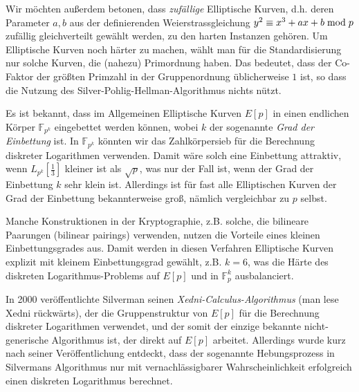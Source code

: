 \begin{refsegment}
Wir möchten außerdem betonen, dass {\em zufällige} Elliptische Kurven, d.h. deren Parameter $a,b$ aus der definierenden Weierstrassgleichung $y^2 \equiv x^3+ax+b \hspace{1mm}{\rm mod}\hspace{1mm} p$ zufällig gleichverteilt
gewählt werden, zu den harten Instanzen gehören. Um Elliptische Kurven noch härter zu machen, wählt man für die Standardisierung nur solche Kurven, die (nahezu) Primordnung haben. Das bedeutet, dass der Co-Faktor der größten Primzahl in der Gruppenordnung üblicherweise $1$ ist, so dass die Nutzung des Silver-Pohlig-Hellman-Algorithmus nichts nützt.

Es ist bekannt, dass im Allgemeinen Elliptische Kurven $E[p]$ in einen endlichen Körper $\mathbb{F}_{p^k}$ eingebettet werden können, wobei $k$ der sogenannte {\em Grad der Einbettung} ist. In $\mathbb{F}_{p^k}$ könnten wir das Zahlkörpersieb für die Berechnung diskreter Logarithmen verwenden. Damit wäre solch eine Einbettung attraktiv, wenn $L_{p^k}[\frac 1 3]$ kleiner ist als $\sqrt p$, was nur der Fall ist, wenn der Grad der Einbettung $k$ sehr klein ist. Allerdings ist für fast alle Elliptischen Kurven der Grad der Einbettung bekannterweise groß, nämlich vergleichbar zu $p$ selbst.

Manche Konstruktionen in der Kryptographie, z.B. solche, die bilineare Paarungen (bilinear pairings) verwenden, nutzen die Vorteile eines kleinen Einbettungsgrades aus. Damit werden in diesen Verfahren Elliptische Kurven explizit mit kleinem Einbettungsgrad gewählt, z.B. $k=6$, was die Härte des diskreten Logarithmus-Problems auf $E[p]$ und in $\mathbb{F}_p^k$ ausbalanciert.

In 2000 veröffentlichte Silverman seinen {\em Xedni-Calculus-Algorithmus} (man lese Xedni rückwärts), der die Gruppenstruktur von $E[p]$ für die Berechnung diskreter Logarithmen verwendet, und der somit der einzige bekannte nicht-generische Algorithmus ist, der direkt auf $E[p]$ arbeitet. Allerdings wurde kurz nach seiner Veröffentlichung entdeckt, dass der sogenannte Hebungsprozess in Silvermans Algorithmus nur mit vernachlässigbarer Wahrscheinlichkeit erfolgreich einen diskreten Logarithmus berechnet.




\end{refsegment}
